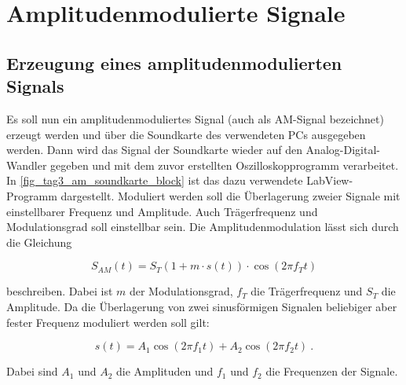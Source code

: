 \documentclass[
a4paper,
12pt,
pagesize,
ngerman
]{scrartcl}
\begin{document}
	\newpage
	
	
	\section{Amplitudenmodulierte Signale}

	\subsection{Erzeugung eines amplitudenmodulierten Signals} \label{AMSignalErzeugung}
	
	Es soll nun ein amplitudenmoduliertes Signal (auch als AM-Signal bezeichnet) erzeugt werden und über die Soundkarte des verwendeten PCs ausgegeben werden.
	Dann wird das Signal der Soundkarte wieder auf den Analog-Digital-Wandler gegeben und mit dem zuvor erstellten Oszilloskopprogramm verarbeitet.
	In \cref{fig_tag3_am_soundkarte_block} ist das dazu verwendete LabView-Programm dargestellt.
	Moduliert werden soll die Überlagerung zweier Signale mit einstellbarer Frequenz und Amplitude.
	Auch Trägerfrequenz und Modulationsgrad soll einstellbar sein.
	Die Amplitudenmodulation lässt sich durch die Gleichung
	
	\begin{equation} \label{AMFormel}
		S_{AM}(t)=S_T (1+m \cdot s(t)) \cdot \cos(2\pi f_T t)
	\end{equation}
	
	\noindent beschreiben.
	Dabei ist $m$ der Modulationsgrad, $f_T$ die Trägerfrequenz und $S_T$ die Amplitude.
	Da die Überlagerung von zwei sinusförmigen Signalen beliebiger aber fester Frequenz moduliert werden soll gilt:
	
	\begin{equation} \label{Ursprungssignal}
		s(t) = A_1 \cos (2\pi f_1 t) + A_2 \cos (2\pi f_2 t) \ . 
	\end{equation}
	
	\noindent Dabei sind $A_1$ und $A_2$ die Amplituden und $f_1$ und $f_2$ die Frequenzen der Signale.
	
\end{document}
